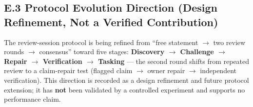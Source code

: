 \documentclass[11pt,a4paper]{article}
\begin{document}
\subsection*{E.3 Protocol Evolution Direction (Design Refinement, Not a Verified Contribution)}

The review-session protocol is being refined from ``free statement $\rightarrow$ two review rounds $\rightarrow$ consensus'' toward five stages: \textbf{Discovery $\rightarrow$ Challenge $\rightarrow$ Repair $\rightarrow$ Verification $\rightarrow$ Tasking} --- the second round shifts from repeated review to a claim-repair test (flagged claim $\rightarrow$ owner repair $\rightarrow$ independent verification). This direction is recorded as a design refinement and future protocol extension; it has \textbf{not} been validated by a controlled experiment and supports no performance claim.
\end{document}
